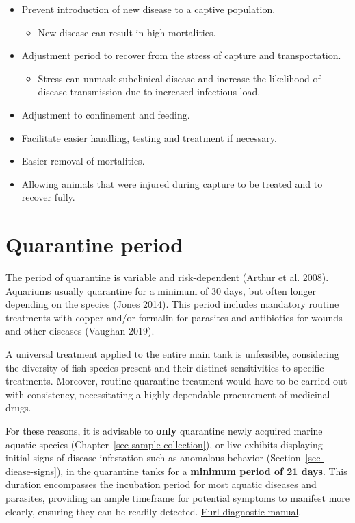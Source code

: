 \documentclass[
  letterpaper,
  DIV=11,
  numbers=noendperiod]{scrreprt}
\providecommand{\tightlist}{%
  \setlength{\itemsep}{0pt}\setlength{\parskip}{0pt}}\usepackage{longtable,booktabs,array}
\begin{document}
\begin{itemize}
\tightlist
\item
  Prevent introduction of new disease to a captive population.

  \begin{itemize}
  \tightlist
  \item
    New disease can result in high mortalities.
  \end{itemize}
\item
  Adjustment period to recover from the stress of capture and
  transportation.

  \begin{itemize}
  \tightlist
  \item
    Stress can unmask subclinical disease and increase the likelihood of
    disease transmission due to increased infectious load.
  \end{itemize}
\item
  Adjustment to confinement and feeding.
\item
  Facilitate easier handling, testing and treatment if necessary.
\item
  Easier removal of mortalities.
\item
  Allowing animals that were injured during capture to be treated and to
  recover fully.
\end{itemize}

\hypertarget{sec-q-period}{%
\section{Quarantine period}\label{sec-q-period}}

The period of quarantine is variable and risk-dependent (Arthur et al.
2008). Aquariums usually quarantine for a minimum of 30 days, but often
longer depending on the species (Jones 2014). This period includes
mandatory routine treatments with copper and/or formalin for parasites
and antibiotics for wounds and other diseases (Vaughan 2019).

A universal treatment applied to the entire main tank is unfeasible,
considering the diversity of fish species present and their distinct
sensitivities to specific treatments. Moreover, routine quarantine
treatment would have to be carried out with consistency, necessitating a
highly dependable procurement of medicinal drugs.

For these reasons, it is advisable to \textbf{only} quarantine newly
acquired marine aquatic species (Chapter~\ref{sec-sample-collection}),
or live exhibits displaying initial signs of disease infestation such as
anomalous behavior (Section~\ref{sec-diease-signs}), in the quarantine
tanks for a \textbf{minimum period of 21 days}. This duration
encompasses the incubation period for most aquatic diseases and
parasites, providing an ample timeframe for potential symptoms to
manifest more clearly, ensuring they can be readily detected.
\href{https://www.eurl-fish-crustacean.eu/fish/diagnostic-manuals}{Eurl
diagnostic manual}.
\end{document}
